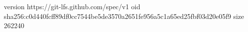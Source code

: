 version https://git-lfs.github.com/spec/v1
oid sha256:c0d440fcff89df0cc7544be5de3570a2651fe956a5c1a65ed25fbf03d20e05f9
size 262240
